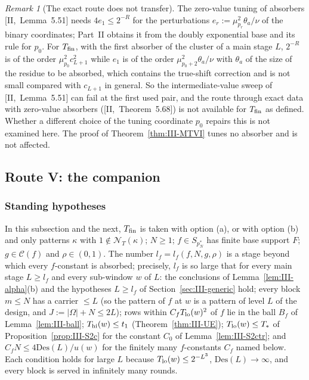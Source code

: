 \documentclass[10pt]{amsart}
\theoremstyle{definition}
\theoremstyle{remark}
\newtheorem{remark}[theorem]{Remark}
\newcommand{\Cset}{\mathcal C}
\begin{document}
\begin{remark}[The exact route does not transfer]\label{rem:III-routeX}
The zero-value tuning of absorbers [II,~Lemma~5.51] needs $4e_1\le2^{-R}$ for
the perturbations $e_r:=\mu_{p_r}^2\theta_a/\nu$ of the binary coordinates;
Part~II obtains it from the doubly exponential base and its rule for $p_0$.
For $T_{\rm fin}$, with the first absorber of the cluster of a main stage $L$,
$2^{-R}$ is of the order $\mu_{p_0}^2c_{L+1}^2$ while $e_1$ is of the order
$\mu_{p_0+2}^2\theta_a/\nu$ with $\theta_a$ of the size of the residue to be
absorbed, which contains the true-shift correction and is not small compared
with $c_{L+1}$ in general.  So the intermediate-value sweep of
[II,~Lemma~5.51] can fail at the first used pair, and the route through exact
data with zero-value absorbers ([II,~Theorem~5.68]) is not available for
$T_{\rm fin}$ as defined.  Whether a different choice of the tuning coordinate
$p_0$ repairs this is not examined here.  The proof of Theorem~\ref{thm:III-MTVI}
tunes no absorber and is not affected.
\end{remark}

\subsection{Route V: the companion}\label{sec:III-routeV}

\subsubsection*{Standing hypotheses}
In this subsection and the next, $T_{\rm fin}$ is taken with option (a), or with
option (b) and only patterns $\kappa$ with $1\notin\mathcal N_T(\kappa)$; $N\ge1$;
$f\in S_{p_N^*}$ has finite base support $F$; $g\in\Cset(f)$ and $\rho\in(0,1)$.
The number $l_f=l_f(f,N,g,\rho)$ is a stage beyond which every $f$-constant is
absorbed; precisely, $l_f$ is so large that for every main stage $L\ge l_f$ and
every sub-window $w$ of $L$: the conclusions of Lemma~\ref{lem:III-alpha}(b) and
the hypotheses $L\ge l_f$ of Section~\ref{sec:III-generic} hold; every block
$m\le N$ has a carrier $\le L$ \textup{(}so the pattern of $f$ at $w$ is a pattern
of level $L$ of the design, and $J:=|\Omega|+N\le2L$\textup{)}; rows within
$C_fT_{\rm lo}(w)^2$ of $f$ lie in the ball $B_f$ of Lemma~\ref{lem:III-ball};
$T_{\rm hi}(w)\le t_1$ (Theorem~\ref{thm:III-UE}); $T_{\rm lo}(w)\le T_*$ of
Proposition~\ref{prop:III-S2c} for the constant $C_0$ of
Lemma~\ref{lem:III-S2ctr}; and $C_fN\le4\mathrm{Des}(L)/u(w)$ for the finitely
many $f$-constants $C_f$ named below.  Each condition holds for large $L$
because $T_{\rm lo}(w)\le2^{-L^3}$, $\mathrm{Des}(L)\to\infty$, and every block is
served in infinitely many rounds.
\end{document}
